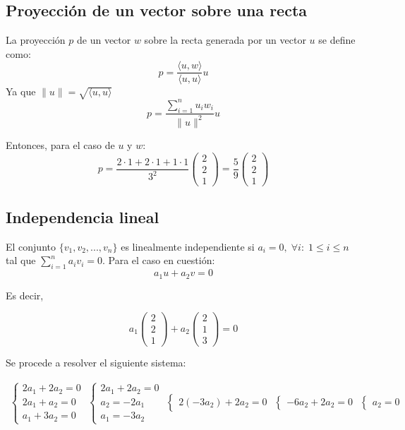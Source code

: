 \documentclass[a4paper,spanish]{article}
\begin{document}
\subsection*{Proyección de un vector sobre una recta}
La proyección $p$ de un vector $w$ sobre la recta generada por un vector $u$ se define como:
\[
    p = \frac{\langle u, w \rangle}{\langle u, u \rangle}u
\]
Ya que $\lVert u \rVert = \sqrt{\langle u,u \rangle}$
\[
    p = \frac{\displaystyle\sum_{i=1}^{n}u_{i}w_{i}}{\lVert u \rVert^2}u
\]

Entonces, para el caso de $u$ y $w$:
\[
    p = \frac{2 \cdot 1 + 2 \cdot 1 + 1 \cdot 1}{3^2} \left(\begin{matrix}2 \\2\\1\end{matrix}\right) = \frac{5}{9} \left(\begin{matrix}2 \\2\\1\end{matrix}\right)
\]

\subsection*{Independencia lineal}
El conjunto $\{v_1,v_2, ...,v_n\}$ es linealmente independiente si $a_i = 0, \; \forall i: \; 1\leq i \leq n$ tal que $\displaystyle\sum_{i=1}^n a_i v_i = 0$. Para el caso en cuestión:
\[
    a_1u + a_2v = 0
\]

Es decir,

\[
    a_1 \left(\begin{matrix}2 \\2\\1\end{matrix}\right) + a_2 \left(\begin{matrix}2 \\1\\3\end{matrix}\right) = 0
\]

Se procede a resolver el siguiente sistema:

\begin{align*}
    \begin{cases}
        2a_1 + 2a_2 = 0 \\
        2a_1 + a_2 = 0  \\
        a_1 + 3a_2 = 0
    \end{cases}
    \;
    \begin{cases}
        2a_1 + 2a_2 = 0 \\
        a_2 = -2a_1     \\
        a_1 = -3a_2
    \end{cases}
    \;
    \begin{cases}
        2(-3a_2) + 2a_2 = 0
    \end{cases}
    \;
    \begin{cases}
        -6a_2 + 2a_2 = 0
    \end{cases}
    \;
    \begin{cases}
        a_2 = 0
    \end{cases}
\end{align*}
\end{document}
